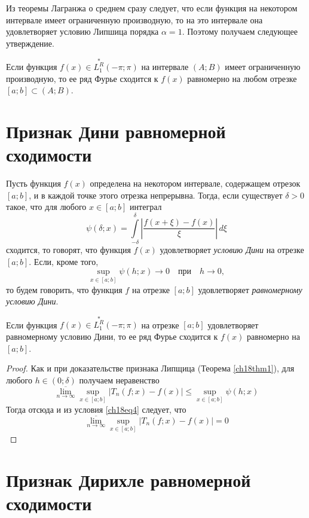 Из теоремы Лагранжа о среднем сразу следует, что если функция на некотором интервале имеет ограниченную производную, то на это интервале она удовлетворяет условию Липшица порядка $\alpha = 1$. Поэтому получаем следующее утверждение.
\begin{cons}
Если функция $f(x) \in \overset{*}{L^{R}_1}(-\pi;\pi)$ на интервале $(A;B)$ имеет ограниченную производную, то ее ряд Фурье сходится к $f(x)$ равномерно на любом отрезке $[a;b] \subset (A;B)$.
\end{cons}

\section{Признак Дини равномерной сходимости}
Пусть функция $f(x)$ определена на некотором интервале, содержащем отрезок $[a;b]$, и в каждой точке этого отрезка непрерывна. Тогда, если существует $\delta > 0$ такое, что для любого $x \in [a;b]$ интеграл
$$
\psi(\delta ; x) = \int\limits_{-\delta}^{\delta} \left|\frac{f(x + \xi) - f(x)}{\xi}\right|\, d\xi
$$
сходится, то говорят, что функция $f(x)$ удовлетворяет \textit{условию Дини} на отрезке $[a;b]$. Если, кроме того,
\begin{equation} \label{ch18eq4}
\sup\limits_{x \in [a;b]} \psi(h;x) \to 0 \quad \text{при} \quad h \to 0 ,
\end{equation}
то будем говорить, что функция $f$ на отрезке $[a;b]$ удовлетворяет \textit{равномерному условию Дини}.

\begin{thm}  \label{ch18thm2}
Если функция $f(x) \in \overset{*}{L^{R}_1}(-\pi;\pi)$ на отрезке $[a;b]$ удовлетворяет равномерному условию Дини, то ее ряд Фурье сходится к $f(x)$ равномерно на $[a;b]$.
\end{thm}
\begin{proof}
Как и при доказательстве признака Липщица (Теорема \ref{ch18thm1}), для любого $h \in (0;\delta)$ получаем неравенство
$$
\overline{\lim\limits_{n \to \infty}} \sup \limits_{x \in [a;b]} |T_n(f; x) - f(x)| \le \sup\limits_{x \in [a;b]} \psi(h;x)
$$
Тогда отсюда и из условия \eqref{ch18eq4} следует, что
$$
\overline{\lim\limits_{n \to \infty}} \sup \limits_{x \in [a;b]} |T_n(f; x) - f(x)| = 0
$$
\end{proof}

\section{Признак Дирихле равномерной сходимости}

